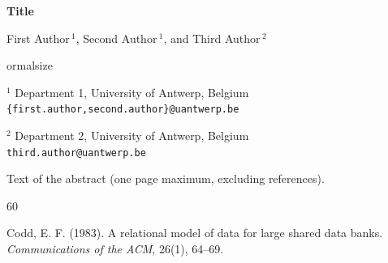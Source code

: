 \documentclass[11pt]{article}
\begin{document}
\begin{center}
    \Large{\textbf{Title}}
    
    \vspace{0.5cm}
    
    
    \large{First Author$\,^1$, Second Author$\,^1$, and Third Author$\,^2$}
    
    \vspace{0.5cm}
    
    
ormalsize
    
    
    $^1$ Department 1, University of Antwerp, Belgium\\
    \texttt{\{first.author,second.author\}@uantwerp.be}
    
    $^2$ Department 2, University of Antwerp, Belgium\\
    \texttt{third.author@uantwerp.be}
    
    \vspace{0.6cm}
    
\end{center}

Text of the abstract (one page maximum, excluding references).

\begin{thebibliography}{60}

 Codd, E. F. (1983). A relational model of data for large shared data banks. \textit{Communications of the ACM}, 26(1), 64--69.

\end{thebibliography}
\end{document}
